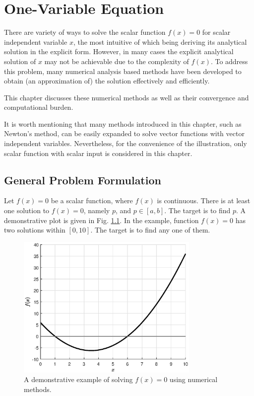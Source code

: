 \chapter{One-Variable Equation}

There are variety of ways to solve the scalar function $f(x)=0$ for scalar independent variable $x$, the most intuitive of which being deriving its analytical solution in the explicit form. However, in many cases the explicit analytical solution of $x$ may not be achievable due to the complexity of $f(x)$. To address this problem, many numerical analysis based methods have been developed to obtain (an approximation of) the solution effectively and efficiently.

This chapter discusses these numerical methods as well as their convergence and computational burden.

It is worth mentioning that many methods introduced in this chapter, such as Newton's method, can be easily expanded to solve vector functions with vector independent variables. Nevertheless, for the convenience of the illustration, only scalar function with scalar input is considered in this chapter.

\section{General Problem Formulation}

Let $f(x)=0$ be a scalar function, where $f(x)$ is continuous. There is at least one solution to $f(x)=0$, namely $p$, and $p\in \left[a, b\right]$. The target is to find $p$. A demonstrative plot is given in Fig. \ref{fig:part-5:onevarproblemformulation}. In the example, function $f(x)=0$ has two solutions within $\left[0, 10\right]$. The target is to find any one of them.

\begin{figure}[!htbp]
\centering
\includegraphics[width=250pt]{chapters/part-5/figures/demo_problem_formulation.eps}
\caption{A demonstrative example of solving $f(x)=0$ using numerical methods.} \label{fig:part-5:onevarproblemformulation}
\end{figure} 

